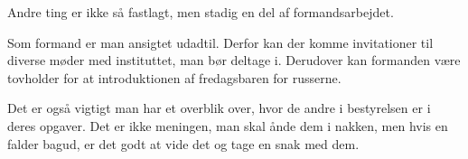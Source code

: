 Andre ting er ikke så fastlagt, men stadig en del af formandsarbejdet.

Som formand er man ansigtet udadtil. Derfor kan der komme invitationer
til diverse møder med instituttet, man bør deltage i.
Derudover kan formanden være tovholder for at introduktionen af fredagsbaren for
russerne.

Det er også vigtigt man har et overblik over, hvor de andre i
bestyrelsen er i deres opgaver. Det er ikke meningen, man skal ånde
dem i nakken, men hvis en falder bagud, er det godt at vide det og
tage en snak med dem.



